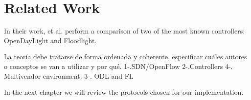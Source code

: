 \chapter{Related Work}\label{ch:relwork}



\bigskip
\bigskip
\bigskip
In their work, et al.\cite{rowshanrad2016performance} perform a comparison of two of the most known controllers: OpenDayLight and Floodlight.
\bigskip


La teoría debe tratarse de forma ordenada y coherente, especificar cuáles autores o conceptos se van a utilizar y por qué.
1-.SDN/OpenFlow
2-.Controllers
4-. Multivendor environment.
3-. ODL and FL


In the next chapter we will review the protocols chosen for our implementation.
